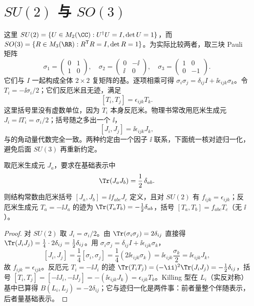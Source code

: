 \section{\texorpdfstring{$SU(2)$ 与 $SO(3)$}{SU(2) 与 SO(3)}}

这里 $SU(2)=\{U\in M_2(\CC):U^\dagger U=I,\det U=1\}$，而 $SO(3)=\{R\in M_3(\RR):R^{\mathsf T}R=I,\det R=1\}$。为实际比较两者，取三块 Pauli 矩阵
\[
\sigma_1=\begin{pmatrix}0&1\\1&0\end{pmatrix},\quad
\sigma_2=\begin{pmatrix}0&-\ii\\\ii&0\end{pmatrix},\quad
\sigma_3=\begin{pmatrix}1&0\\0&-1\end{pmatrix}.
\]
它们与 $I$ 一起构成全体 $2\times2$ 复矩阵的基。逐项相乘可得 $\sigma_i\sigma_j=\delta_{ij}I+\ii\epsilon_{ijk}\sigma_k$。令 $T_i=-\ii\sigma_i/2$；它们反厄米且无迹，满足
\[
[T_i,T_j]=\epsilon_{ijk}T_k.
\]
这里括号里没有虚数单位，因为 $T_i$ 本身反厄米。物理书常改用厄米生成元 $J_i=\ii T_i=\sigma_i/2$；括号随之多出一个 $\ii$，
\[
[J_i,J_j]=\ii\epsilon_{ijk}J_k,
\]
与的角动量代数完全一致。两种约定由一个因子 $\ii$ 联系，下面统一核对迹归一化，避免后面 $SU(3)$ 再重新约定。

\begin{proposition}[生成元的迹归一化与结构常数]\label{prop:gen-normalization}
取厄米生成元 $J_a$，要求在基础表示中
\begin{equation}
\Tr(J_aJ_b)=\frac12\,\delta_{ab}.
\label{eq:hermitian-normalization}
\end{equation}
则结构常数由厄米括号 $[J_a,J_b]=\ii f_{abc}J_c$ 定义，且对 $SU(2)$ 有 $f_{ijk}=\epsilon_{ijk}$；反厄米生成元 $T_a=-\ii J_a$ 的迹为 $\Tr(T_aT_b)=-\tfrac12\delta_{ab}$，括号 $[T_a,T_b]=f_{abc}T_c$（无 $\ii$）。
\end{proposition}

\begin{proof}
对 $SU(2)$ 取 $J_i=\sigma_i/2$。由 $\Tr(\sigma_i\sigma_j)=2\delta_{ij}$ 直接得 $\Tr(J_iJ_j)=\tfrac14\cdot2\delta_{ij}=\tfrac12\delta_{ij}$。用 $\sigma_i\sigma_j=\delta_{ij}I+\ii\epsilon_{ijk}\sigma_k$，
\[
[J_i,J_j]=\frac14[\sigma_i,\sigma_j]=\frac14(2\ii\epsilon_{ijk}\sigma_k)=\ii\epsilon_{ijk}\frac{\sigma_k}{2}=\ii\epsilon_{ijk}J_k,
\]
故 $f_{ijk}=\epsilon_{ijk}$。反厄元 $T_i=-\ii J_i$ 的迹 $\Tr(T_iT_j)=(-\ii)^2\Tr(J_iJ_j)=-\tfrac12\delta_{ij}$，括号 $[T_i,T_j]=[-\ii J_i,-\ii J_j]=-(\ii\epsilon_{ijk}J_k)=\epsilon_{ijk}T_k$。Killing 型在 $L_i$（实反对称）基中已算得 $B(L_i,L_j)=-2\delta_{ij}$；它与迹归一化是两件事：前者量整个伴随表示，后者量基础表示。
\end{proof}

